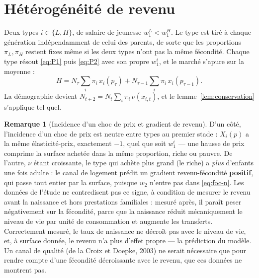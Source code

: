\documentclass[11pt,a4paper]{article}
\theoremstyle{plain}
\theoremstyle{definition}
\newtheorem{remarque}{Remarque}
\begin{document}
\section{Hétérogénéité de revenu}

Deux types $i \in \{L,H\}$, de salaire de jeunesse $w_1^L < w_1^H$. Le type est tiré à chaque génération indépendamment de celui des parents, de sorte que les proportions $\pi_L, \pi_H$ restent fixes même si les deux types n'ont pas la même fécondité. Chaque type résout \eqref{eq:P1} puis \eqref{eq:P2} avec son propre $w_1^i$, et le marché s'apure sur la moyenne :
\[
H = N_\tau \sum_i \pi_i\, x_i(p_\tau) + N_{\tau-1} \sum_i \pi_i\, x_i(p_{\tau-1}) .
\]
La démographie devient $N_{t+2} = N_t \sum_i \pi_i\, \nu(x_{i,t})$, et le lemme~\ref{lem:conservation} s'applique tel quel.

\begin{remarque}[Incidence d'un choc de prix et gradient de revenu]
D'un côté, l'incidence d'un choc de prix est neutre entre types au premier stade : $X_i(p)$ a la même élasticité-prix, exactement $-1$, quel que soit $w_1^i$ — une hausse de prix comprime la surface achetée dans la même proportion, riche ou pauvre. De l'autre, $\nu$ étant croissante, le type qui achète plus grand (le riche) a \emph{plus} d'enfants une fois adulte : le canal de logement prédit un gradient revenu-fécondité \textbf{positif}, qui passe tout entier par la surface, puisque $w_2$ n'entre pas dans \eqref{eq:foc-n}. Les données de l'étude ne contredisent pas ce signe, à condition de mesurer le revenu avant la naissance et hors prestations familiales : mesuré après, il paraît peser négativement sur la fécondité, parce que la naissance réduit mécaniquement le niveau de vie par unité de consommation et augmente les transferts. Correctement mesuré, le taux de naissance ne décroît pas avec le niveau de vie, et, à surface donnée, le revenu n'a plus d'effet propre — la prédiction du modèle. Un canal de qualité (de la Croix et Doepke, 2003) ne serait nécessaire que pour rendre compte d'une fécondité décroissante avec le revenu, que ces données ne montrent pas.
\end{remarque}
\end{document}
